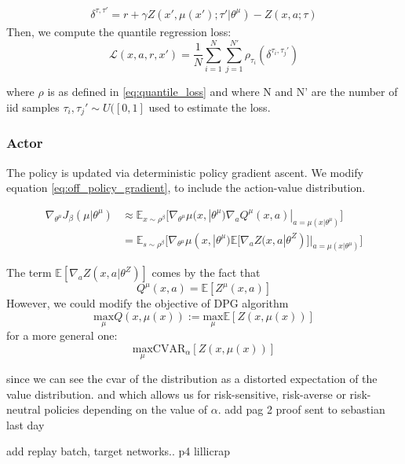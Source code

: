 \begin{align}
    \delta^{\tau, \tau'} = r + \gamma Z(x',\mu(x');\tau'| \theta^\mu)-Z(x,a;\tau)
\end{align}
Then, we compute the quantile regression loss:
\begin{equation}
    \mathcal{L}(x,a,r,x')= \frac{1}{N}\sum_{i=1}^{N}\sum_{j=1}^{N'}\rho_{\tau_i}(\delta^{\tau_i, \tau_j'})
\end{equation}

where $\rho$ is as defined in \eqref{eq:quantile_loss} and 
where N and N' are the number of iid samples $\tau_i, \tau_j' \sim U([0,1]$ used to estimate the loss.

\subsubsection{Actor}
The policy is updated via deterministic policy gradient ascent.
We modify equation  \eqref{eq:off_policy_gradient}, to include the action-value distribution.

\begin{align}
    \nabla_{\theta^\mu} J_\beta(\mu | \theta^\mu) &\approx \mathbb E_{x \sim \rho^\beta} 
    \big [\nabla_{\theta^\mu} \mu(x,| \theta^\mu) \nabla_a Q^{\mu}(x,a)|_{a=\mu(x| \theta^\mu)}  \big]\\
    &=\mathbb E_{s \sim \rho^\beta} 
    \big [\nabla_{\theta^\mu} \mu(x,| \theta^\mu) \mathbb E [\nabla_a Z(x,a | \theta^Z)]|_{a=\mu(x| \theta^\mu)}  \big]
\end{align}

The term $\mathbb E [\nabla_a Z(x,a | \theta^Z)]$ comes by the fact that
\begin{equation}
    Q^\mu(x,a) = \mathbb E[Z^\mu(x,a)]
\end{equation}
However, we could modify the objective of DPG algorithm
\begin{equation}
    \underset{\mu}{\text{max}} Q(x,\mu(x)) := \underset{\mu}{\text{max}} \mathbb E[Z(x,\mu(x))]
\end{equation}
for a more general one:
\begin{equation}
    \underset{\mu}{\text{max}} \text{CVAR}_\alpha[Z(x,\mu(x))]   
\end{equation}

since we can see the cvar of the distribution as a distorted expectation of the value distribution. 
and which allows us for risk-sensitive, risk-averse or risk-neutral policies depending on the value of $\alpha$.
add pag 2 proof sent to sebastian last day



add replay batch, target networks.. p4 lillicrap


















